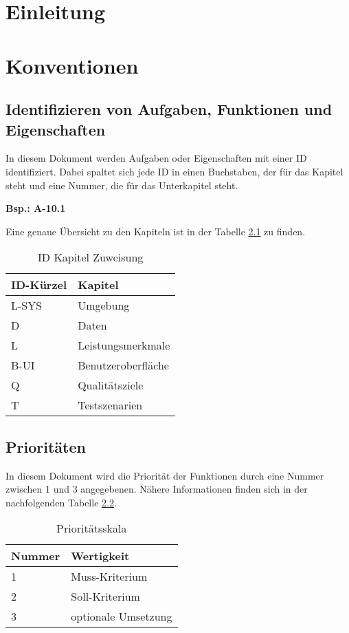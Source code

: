 
\chapter{Einleitung}


\chapter{Konventionen}
\section{Identifizieren von Aufgaben, Funktionen und Eigenschaften}
In diesem Dokument werden Aufgaben oder Eigenschaften mit einer ID identifiziert.
Dabei spaltet sich jede ID in einen Buchstaben, der für das Kapitel steht und eine Nummer, die für das Unterkapitel steht.\\
\begin{center}
    \textbf{Bsp.: A-10.1}
\end{center}
Eine genaue Übersicht zu den Kapiteln ist in der Tabelle \ref{einleitung:kapitel} zu finden.
\begin{table}[H]
    \caption{ID Kapitel Zuweisung}
    \label{einleitung:kapitel}
    \begin{tabularx}{\textwidth}{|l|X|}
        \toprule
        \textbf{ID-Kürzel} & \textbf{Kapitel} \\
        \endhead
        \hline
        L-SYS & Umgebung \\
        D & Daten \\
        L & Leistungsmerkmale \\
        B-UI & Benutzeroberfläche \\
        Q & Qualitätsziele \\
        T & Testszenarien \\
        \hline
    \end{tabularx}
\end{table}

\section{Prioritäten}
In diesem Dokument wird die Priorität der Funktionen durch eine Nummer zwischen 1 und 3 angegebenen. Nähere Informationen finden sich in der nachfolgenden Tabelle \ref{einleitung:priority}.
\begin{table}[H]
    \caption{Prioritätsskala}
    \label{einleitung:priority}
    \begin{tabularx}{\textwidth}{|l|X|}
        \toprule
        \textbf{Nummer} & \textbf{Wertigkeit}\\
        \endhead
        \hline
        1 & Muss-Kriterium\\
        2 & Soll-Kriterium\\
        3 & optionale Umsetzung\\
        \hline
    \end{tabularx}
\end{table}



